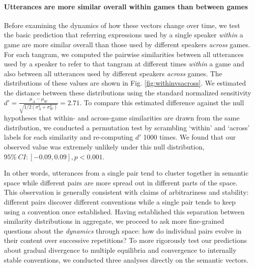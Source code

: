 \documentclass[alpha-refs]{wiley-article}
\begin{document}
\paragraph{Utterances are more similar overall within games than between games}  
Before examining the dynamics of how these vectors change over time, we test the basic prediction that referring expressions used by a single speaker \emph{within} a game are more similar overall than those used by different speakers \emph{across} games.
For each tangram, we computed the pairwise similarities between all utterances used by a speaker to refer to that tangram at different times \emph{within} a game and also between all utterances used by different speakers \emph{across} games. 
The distributions of these values are shown in Fig. \ref{fig:withinvsacross}.
We estimated the distance between these distributions using the standard normalized sensitivity $d' = \frac{\mu_A - \mu_W}{\sqrt{1/2(\sigma^2_A+\sigma^2_W)}} = 2.71$.
To compare this estimated difference against the null hypotheses that within- and across-game similarities are drawn from the same distribution, we conducted a permutation test by scrambling `within' and `across' labels for each similarity and re-computing $d'$ 1000 times. 
We found that our observed value was extremely unlikely under this null distribution, $95\%~CI: [-0.09, 0.09], p < 0.001$. 

In other words, utterances from a single pair tend to cluster together in semantic space while different pairs are more spread out in different parts of the space.
This observation is generally consistent with claims of arbitrariness and stability: different pairs discover different conventions while a single pair tends to keep using a convention once established.
Having established this separation between similarity distributions in aggregate, we proceed to ask more fine-grained questions about the \emph{dynamics} through space: how do individual pairs evolve in their content over successive repetitions?
To more rigorously test our predictions about gradual divergence to multiple equilibria and convergence to internally stable conventions, we conducted three analyses directly on the semantic vectors.
\end{document}

